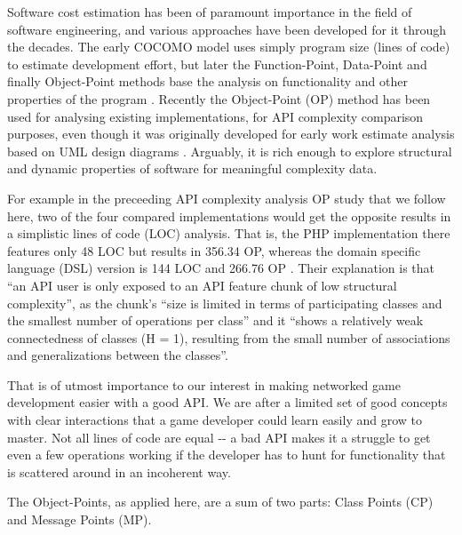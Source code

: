 \documentclass[conference]{IEEEtran}
\begin{document}
Software cost estimation has been of paramount importance in the field
of software engineering, and various approaches have been developed
for it through the decades. The early COCOMO model uses simply program
size (lines of code) to estimate development effort, but later the
Function-Point, Data-Point and finally Object-Point methods base the
analysis on functionality and other properties of the program
\cite{henrich97repositorybased}. Recently the Object-Point (OP) method has been
used for analysing existing implementations, for API complexity
comparison purposes, even though it was originally developed for early
work estimate analysis based on UML design diagrams
\cite{api-complexity-analysis}. Arguably, it is rich enough to explore
structural and dynamic properties of software for meaningful
complexity data.

For example in the preceeding API complexity analysis OP study that we
follow here, two of the four compared implementations would get the
opposite results in a simplistic lines of code (LOC) analysis. That
is, the PHP implementation there features only 48 LOC but results in
356.34 OP, whereas the domain specific language (DSL) version is 144
LOC and 266.76 OP \cite{api-complexity-analysis}. Their explanation is
that ``an API user is only exposed to an API feature chunk of low
structural complexity'', as the chunk's ``size is limited in terms of
participating classes and the smallest number of operations per class''
and it ``shows a relatively weak connectedness of classes (H = 1),
resulting from the small number of associations and generalizations
between the classes''.

That is of utmost importance to our interest in making networked game
development easier with a good API. We are after a limited set of good
concepts with clear interactions that a game developer could learn
easily and grow to master. Not all lines of code are equal -{}- a bad
API makes it a struggle to get even a few operations working if the
developer has to hunt for functionality that is scattered around in an
incoherent way.

The Object-Points, as applied here, are a sum of two parts: Class
Points (CP) and Message Points (MP).

\end{document}
